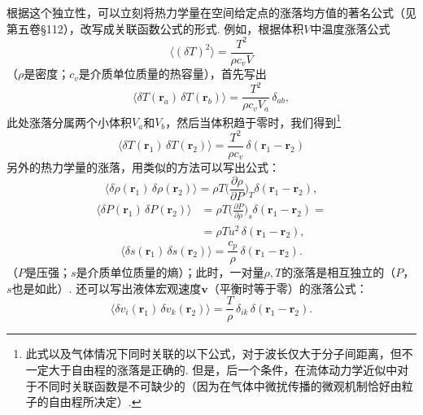 根据这个独立性，可以立刻将热力学量在空间给定点的涨落均方值的著名公式（见第五卷§112），改写成关联函数公式的形式. 例如，根据体积$V$中温度涨落公式
\begin{equation*}
\bigl\langle(\delta T)^{2}\bigr\rangle=\frac{T^{2}}{\rho c_{v}V}
\end{equation*}
（$\rho$是密度；$c_{v}$是介质单位质量的热容量），首先写出
\begin{equation*}
\bigl\langle\delta T(\bm{r}_{a})\,\delta T(\bm{r}_{b})\bigr\rangle=\frac{T^{2}}{\rho c_{v}V_{a}}\,\delta_{ab},
\end{equation*}
此处涨落分属两个小体积$V_{a}$和$V_{b}$，然后当体积趋于零时，我们得到\footnote{此式以及气体情况下同时关联的以下公式，对于波长仅大于分子间距离，但不一定大于自由程的涨落是正确的. 但是，后一个条件，在流体动力学近似中对于不同时关联函数是不可缺少的（因为在气体中微扰传播的微观机制恰好由粒子的自由程所决定）.}
\begin{equation}
\bigl\langle\delta T(\bm{r}_{1})\,\delta T(\bm{r}_{2})\bigr\rangle=\frac{T^{2}}{\rho c_{v}}\,\delta(\bm{r}_{1}-\bm{r}_{2})
\end{equation}
另外的热力学量的涨落，用类似的方法可以写出公式：
\begin{equation}
\bigl\langle\delta\rho(\bm{r}_{1})\,\delta\rho(\bm{r}_{2})\bigr\rangle=\rho T\biggl(\frac{\partial\rho}{\partial P}\biggr)_{T}\delta(\bm{r}_{1}-\bm{r}_{2}),
\end{equation}
\begin{equation}
\begin{split}
\bigl\langle\delta P(\bm{r}_{1})\,\delta P(\bm{r}_{2})\bigr\rangle&=\rho T\biggl(\frac{\partial P}{\partial\rho}\biggr)_{s}\delta(\bm{r}_{1}-\bm{r}_{2})=\\
&=\rho Tu^{2}\,\delta(\bm{r}_{1}-\bm{r}_{2}),
\end{split}
\end{equation}
\begin{equation}
\bigl\langle\delta s(\bm{r}_{1})\,\delta s(\bm{r}_{2})\bigr\rangle=\frac{c_{p}}{\rho}\,\delta(\bm{r}_{1}-\bm{r}_{2}).
\end{equation}
（$P$是压强；$s$是介质单位质量的熵）；此时，一对量$\rho,T$的涨落是相互独立的（$P$，$s$也是如此）. 还可以写出液体宏观速度$\bm{v}$（平衡时等于零）的涨落公式：
\begin{equation}
\bigl\langle\delta v_{i}(\bm{r}_{1})\,\delta v_{k}(\bm{r}_{2})\bigr\rangle=\frac{T}{\rho}\,\delta_{ik}\,\delta(\bm{r}_{1}-\bm{r}_{2}).
\end{equation}

